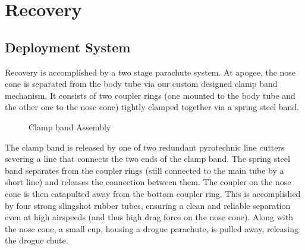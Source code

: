 \section{Recovery}
\label{sec:recovery}

\subsection{Deployment System}

Recovery is accomplished by a two stage parachute system. At apogee, the nose cone is separated from the body tube via our custom designed clamp band mechanism. It consists of two coupler rings (one mounted to the body tube and the other one to the nose cone) tightly clamped together via a spring steel band.

\begin{figure}[h]
\centering
{}
\caption{Clamp band Assembly}
\label{fig:clampband}
\end{figure}

 The clamp band is released by one of two redundant pyrotechnic line cutters severing a line that connects the two ends of the clamp band. The spring steel band separates from the coupler rings (still connected to the main tube by a short line) and releases the connection between them. The coupler on the nose cone is then catapulted away from the bottom coupler ring. This is accomplished by four strong slingshot rubber tubes, ensuring a clean and reliable separation even at high airspeeds (and thus high drag force on the nose cone). Along with the nose cone, a small cup, housing a drogue parachute, is pulled away, releasing the drogue chute.


